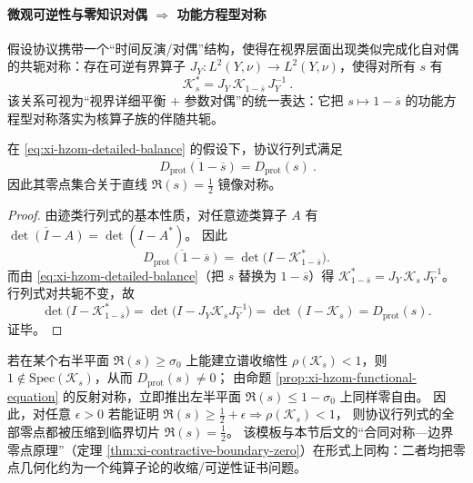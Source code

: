 \paragraph{微观可逆性与零知识对偶 \texorpdfstring{$\Rightarrow$}{=>} 功能方程型对称}
假设协议携带一个“时间反演/对偶”结构，使得在视界层面出现类似完成化自对偶的共轭对称：存在可逆有界算子 \(J_Y:L^2(Y,\nu)\to L^2(Y,\nu)\)，使得对所有 \(s\) 有
\begin{equation}\label{eq:xi-hzom-detailed-balance}
\boxed{\ \mathcal{K}_s^{*}=J_Y\,\mathcal{K}_{1-\overline{s}}\,J_Y^{-1}\ }.
\end{equation}
该关系可视为“视界详细平衡 \(+\) 参数对偶”的统一表达：它把 \(s\mapsto 1-\overline{s}\) 的功能方程型对称落实为核算子族的伴随共轭。

\begin{proposition}[详细平衡共轭 \texorpdfstring{$\Rightarrow$}{=>} 行列式反射对称]\label{prop:xi-hzom-functional-equation}
在 \eqref{eq:xi-hzom-detailed-balance} 的假设下，协议行列式满足
\[
\boxed{\ \overline{D_{\mathrm{prot}}(1-\overline{s})}=D_{\mathrm{prot}}(s)\ }.
\]
因此其零点集合关于直线 \(\Re(s)=\tfrac12\) 镜像对称。
\end{proposition}

\begin{proof}
由迹类行列式的基本性质，对任意迹类算子 \(A\) 有 \(\overline{\det(I-A)}=\det(I-A^{*})\)。
因此
\[
\overline{D_{\mathrm{prot}}(1-\overline{s})}
=\det\!\bigl(I-\mathcal{K}_{1-\overline{s}}^{*}\bigr).
\]
而由 \eqref{eq:xi-hzom-detailed-balance}（把 \(s\) 替换为 \(1-\overline{s}\)）得
\(
\mathcal{K}_{1-\overline{s}}^{*}=J_Y\,\mathcal{K}_{s}\,J_Y^{-1}
\)。
行列式对共轭不变，故
\[
\det\!\bigl(I-\mathcal{K}_{1-\overline{s}}^{*}\bigr)
=
\det\!\bigl(I-J_Y\mathcal{K}_sJ_Y^{-1}\bigr)
=
\det(I-\mathcal{K}_s)
=D_{\mathrm{prot}}(s).
\]
证毕。
\end{proof}

\begin{remark}\label{rem:xi-hzom-contraction-template}
若在某个右半平面 \(\Re(s)\ge \sigma_0\) 上能建立谱收缩性 \(\rho(\mathcal{K}_s)<1\)，则 \(1\notin\mathrm{Spec}(\mathcal{K}_s)\)，从而 \(D_{\mathrm{prot}}(s)\neq 0\)；
由命题 \ref{prop:xi-hzom-functional-equation} 的反射对称，立即推出左半平面 \(\Re(s)\le 1-\sigma_0\) 上同样零自由。
因此，对任意 \(\epsilon>0\) 若能证明
\(
\Re(s)\ge \tfrac12+\epsilon\Rightarrow \rho(\mathcal{K}_s)<1
\)，
则协议行列式的全部零点都被压缩到临界切片 \(\Re(s)=\tfrac12\)。
该模板与本节后文的“合同对称—边界零点原理”（定理 \ref{thm:xi-contractive-boundary-zero}）在形式上同构：二者均把零点几何化约为一个纯算子论的收缩/可逆性证书问题。
\end{remark}

